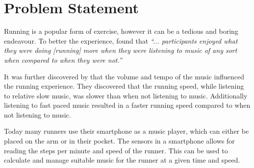 \section{Problem Statement}
Running is a popular form of exercise, however it can be a tedious and boring endeavour.
To better the experience, \citet{musicRunEffectArticle} found that 
\textit{``... participants enjoyed what they were doing [running] more when they were listening to music of any sort when compared to when they were not.''}

It was further discovered by \citet{musicRunEffectArticle} that the volume and tempo of the music influenced the running experience.
They discovered that the running speed, while listening to relative slow music, was slower than when not listening to music. Additionally listening to fast paced music resulted in a faster running speed compared to when not listening to music.

Today many runners use their smartphone as a music player, which can either be placed on the arm or in their pocket.
The sensors in a smartphone allows for reading the steps per minute and speed of the runner. This can be used to calculate and manage suitable music for the runner at a given time and speed.


